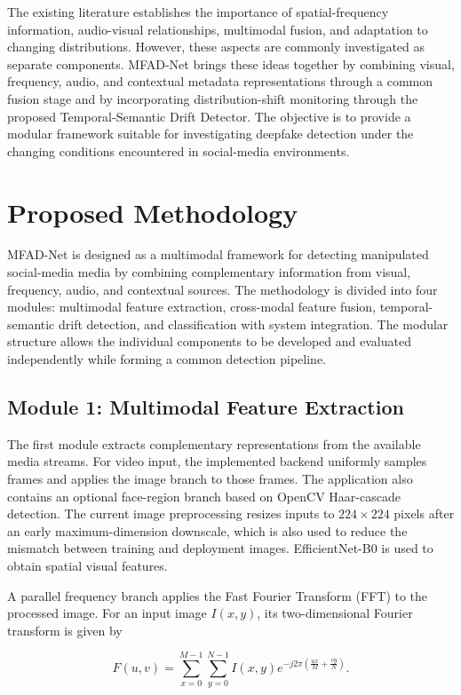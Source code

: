 \documentclass[conference]{IEEEtran}
\begin{document}
The existing literature establishes the importance of spatial-frequency information, audio-visual relationships, multimodal fusion, and adaptation to changing distributions. However, these aspects are commonly investigated as separate components. MFAD-Net brings these ideas together by combining visual, frequency, audio, and contextual metadata representations through a common fusion stage and by incorporating distribution-shift monitoring through the proposed Temporal-Semantic Drift Detector. The objective is to provide a modular framework suitable for investigating deepfake detection under the changing conditions encountered in social-media environments.

\section{Proposed Methodology}

MFAD-Net is designed as a multimodal framework for detecting manipulated social-media media by combining complementary information from visual, frequency, audio, and contextual sources. The methodology is divided into four modules: multimodal feature extraction, cross-modal feature fusion, temporal-semantic drift detection, and classification with system integration. The modular structure allows the individual components to be developed and evaluated independently while forming a common detection pipeline.

\subsection{Module 1: Multimodal Feature Extraction}

The first module extracts complementary representations from the available media streams. For video input, the implemented backend uniformly samples frames and applies the image branch to those frames. The application also contains an optional face-region branch based on OpenCV Haar-cascade detection. The current image preprocessing resizes inputs to $224 \times 224$ pixels after an early maximum-dimension downscale, which is also used to reduce the mismatch between training and deployment images. EfficientNet-B0 is used to obtain spatial visual features.

A parallel frequency branch applies the Fast Fourier Transform (FFT) to the processed image. For an input image $I(x,y)$, its two-dimensional Fourier transform is given by

\begin{equation}
F(u,v)=
\sum_{x=0}^{M-1}
\sum_{y=0}^{N-1}
I(x,y)e^{-j2\pi
\left(\frac{ux}{M}+\frac{vy}{N}\right)}.
\end{equation}
\end{document}
